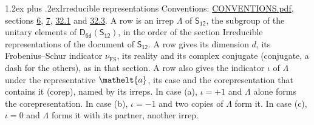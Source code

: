 \documentclass[10pt,a4paper]{article}
\makeatletter
\renewcommand\section{\@startsection{section}{1}{\z@}{-3ex plus -1ex minus -.2ex}%
  {1.2ex plus .2ex}{\normalfont\large\sffamily\bfseries\color{parttitle}}}
\numberwithin{equation}{section}
\newcommand{\eltfont}[1]{{\let\sigma\eltsigma\mathelt{#1}}}
\newcommand{\grp}[1]{\mathsf{#1}}
\newcommand{\elt}[1]{\eltfont{#1}}
\newcommand{\fsind}{\nu_{\mathrm{FS}}}
\makeatother
\begin{document}
\section{Irreducible representations}\label{s:irreps}
Conventions: \href{../../CONVENTIONS.pdf}{CONVENTIONS.pdf}, sections \href{../../../rotation/CONVENTIONS.pdf\#conv.6}{6}, \href{../../../rotation/CONVENTIONS.pdf\#conv.7}{7}, \href{../../CONVENTIONS.pdf\#conv.32.1}{32.1} and \href{../../CONVENTIONS.pdf\#conv.32.3}{32.3}.
\leavevmode\label{n:irrep.Delta}A row is an irrep $\Lambda$ of $\grp{S_{12}}$, the subgroup of the unitary elements of $\grp{D_{6d}}(\grp{S_{12}})$, in the order of the section Irreducible representations of the document of \href{../../../rotation/data/pdf/S12.pdf}{$\grp{S_{12}}$}. \label{n:index.dimension}\label{n:index.frobenius}\label{n:head.irrep}\label{n:head.reality}\label{n:head.conjugate}A row gives its dimension $d$, its Frobenius--Schur indicator $\fsind$, its reality and its complex conjugate (conjugate, a dash for the others), as in that section. \label{n:head.case.corep}\label{n:head.corep}A row also gives the indicator $\iota$ of $\Lambda$ under the representative $\elt{a}$, its case and the corepresentation that contains it (corep), named by its irreps. In case (a), $\iota = +1$ and $\Lambda$ alone forms the corepresentation. In case (b), $\iota = -1$ and two copies of $\Lambda$ form it. In case (c), $\iota = 0$ and $\Lambda$ forms it with its partner, another irrep.
\setlength{\emergencystretch}{2em}\par\setlength{\emergencystretch}{0pt}
\end{document}
